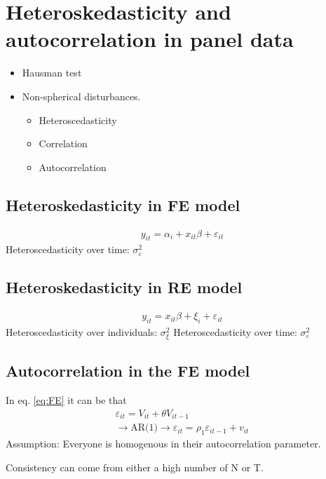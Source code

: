 \section{Heteroskedasticity and autocorrelation in panel data} %
\begin{multicols}{2}
 \begin{itemize}
  \item Hausman test
  \item Non-spherical disturbances.
        \begin{itemize}
         \item Heteroscedasticity
         \item Correlation
         \item Autocorrelation
        \end{itemize}
 \end{itemize}
 \subsection{Heteroskedasticity in FE model}

 \begin{align}
  y_{it}= \alpha_i + x_{it}\beta+\varepsilon_{it}
  \label{eq:FE}
 \end{align}
 Heteroscedasticity over time: $\sigma^2_\varepsilon$\\



 \subsection{Heteroskedasticity in RE model}
 \begin{align}
  y_{it}=x_{it}\beta+\xi_i+\varepsilon_{it}
  \label{eq:RE}
 \end{align}
 Heteroscedasticity over individuals: $\sigma^2_\xi$
 Heteroscedasticity over time: $\sigma^2_\varepsilon$\\



 \subsection{Autocorrelation in the FE model}
 In eq. \ref{eq:FE} it can be that
 \begin{align*}
  \varepsilon_{it}=V_{it}+\theta V_{it-1} \\
  \rightarrow \textrm{AR(1)} \rightarrow \varepsilon_{it}=\rho_1\varepsilon_{it-1}+v_{it}
 \end{align*}
 Assumption: Everyone is homogenous in their autocorrelation parameter.\par
 Consistency can come from either a high number of N or T.



\end{multicols}
